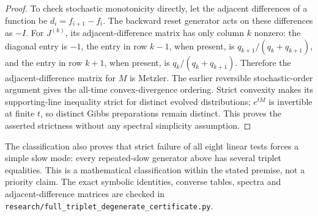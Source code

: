 \begin{proof}
To check stochastic monotonicity directly, let the adjacent differences
of a function be $d_i=f_{i+1}-f_i$. The backward reset generator acts
on these differences as $-I$. For $J^{(k)}$, its adjacent-difference
matrix has only column $k$ nonzero: the diagonal entry is $-1$,
the entry in row $k-1$, when present, is $q_{k+1}/(q_k+q_{k+1})$,
and the entry in row $k+1$, when present, is
$q_k/(q_k+q_{k+1})$. Therefore the adjacent-difference matrix for
$M$ is Metzler. The earlier reversible stochastic-order argument gives
the all-time convex-divergence ordering. Strict convexity makes its
supporting-line inequality strict for distinct evolved distributions;
$e^{tM}$ is invertible at finite $t$, so distinct Gibbs preparations
remain distinct. This proves the asserted strictness without any
spectral simplicity assumption.
\end{proof}

The classification also proves that strict failure of all eight linear
tests forces a simple slow mode: every repeated-slow generator above
has several triplet equalities. This is a mathematical classification
within the stated premise, not a priority claim. The exact symbolic
identities, converse tables, spectra and adjacent-difference matrices
are checked in \texttt{research/full\_triplet\_degenerate\_certificate.py}.
